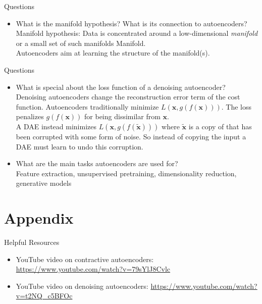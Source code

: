 \documentclass[handout]{beamer}
\begin{document}
 
\begin{frame}[t]{Questions}
    \begin{itemize}
        \item What is the manifold hypothesis? What is its connection to autoencoders?\\
            \vspace{.3cm}
            \pause
        Manifold hypothesis: Data is concentrated around a low-dimensional \textit{manifold} or a small set of such manifolds
        Manifold. \\
        Autoencoders aim at learning the structure of the manifold(s).
    \end{itemize}    
\end{frame}


\begin{frame}[t]{Questions}
    \begin{itemize}
        \item What is special about the loss function of a denoising autoencoder?\\
            \vspace{.2cm}
            \pause
            Denoising autoencoders change the reconstruction error term of the cost function. Autoencoders traditionally minimize $L(\pmb{x}, g(f(\pmb{x})))$. The loss penalizes $g(f(\pmb{x}))$ for being dissimilar from $\pmb{x}$.\\
A DAE instead minimizes $L(\pmb{x}, g(f(\tilde{\pmb{x}})))$ where $\tilde{\pmb{x}}$ is a copy of  that has been corrupted with some form of noise. So instead of copying the input a DAE must learn to undo this corruption.
            \vspace{.3cm}
            \pause
        \item What are the main tasks autoencoders are used for?\\ 
            \pause
            \vspace{.2cm}
Feature extraction, unsupervised pretraining, dimensionality reduction, generative models
    \end{itemize}    
\end{frame}

\appendix
\section{Appendix}


\begin{frame}[t]{Helpful Resources}
   \begin{itemize}
       \item YouTube video on contractive autoencoders: \url{https://www.youtube.com/watch?v=79sYlJ8Cvlc}
       \item YouTube video on denoising autoencoders: \url{https://www.youtube.com/watch?v=t2NQ_c5BFOc}
   \end{itemize} 
\end{frame}
\end{document}
